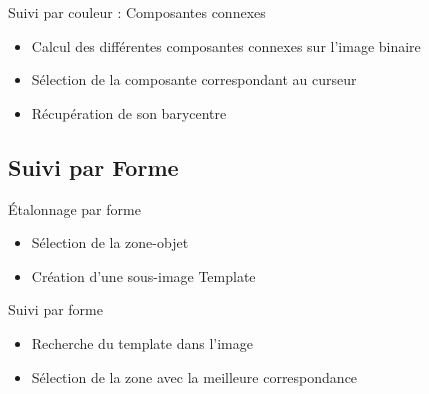 \documentclass{beamer}
\begin{document}
		\begin{frame}{Suivi par couleur : Composantes connexes}
			\begin{itemize}
				\item{Calcul des différentes composantes connexes sur l'image binaire}
				\item{Sélection de la composante correspondant au curseur}
				\item{Récupération de son barycentre} 
			\end{itemize}
		\end{frame}

		\subsection{Suivi par Forme}
		\begin{frame}{Étalonnage par forme}
			\begin{itemize}
				\item{Sélection de la zone-objet}
				\item{Création d'une sous-image Template}
			\end{itemize}
		\end{frame}

		\begin{frame}{Suivi par forme}
			\begin{itemize}
				\item{Recherche du template dans l'image}
				\item{Sélection de la zone avec la meilleure correspondance}
			\end{itemize}
		\end{frame}
\end{document}
